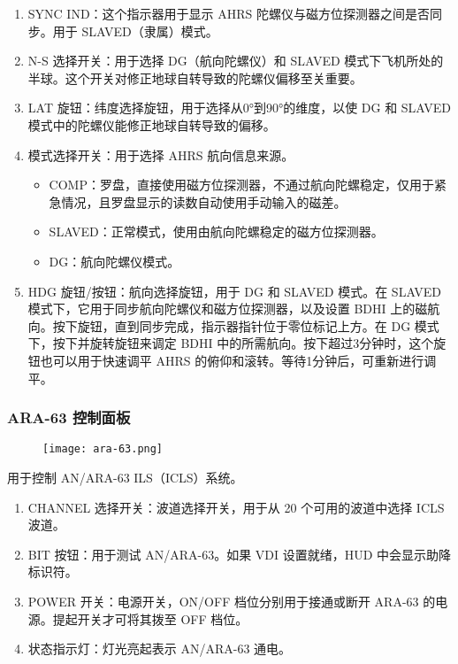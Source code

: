 \begin{enumerate}
	\item SYNC IND：这个指示器用于显示 AHRS 陀螺仪与磁方位探测器之间是否同步。用于 SLAVED（隶属）模式。
	\item N-S 选择开关：用于选择 DG（航向陀螺仪）和 SLAVED 模式下飞机所处的半球。这个开关对修正地球自转导致的陀螺仪偏移至关重要。
	\item LAT 旋钮：纬度选择旋钮，用于选择从0°到90°的维度，以使 DG 和 SLAVED 模式中的陀螺仪能修正地球自转导致的偏移。
	\item 模式选择开关：用于选择 AHRS 航向信息来源。
	      \begin{itemize}
		      \item COMP：罗盘，直接使用磁方位探测器，不通过航向陀螺稳定，仅用于紧急情况，且罗盘显示的读数自动使用手动输入的磁差。
		      \item SLAVED：正常模式，使用由航向陀螺稳定的磁方位探测器。
		      \item DG：航向陀螺仪模式。
	      \end{itemize}
	\item HDG 旋钮/按钮：航向选择旋钮，用于 DG 和 SLAVED 模式。在 SLAVED 模式下，它用于同步航向陀螺仪和磁方位探测器，以及设置 BDHI 上的磁航向。按下旋钮，直到同步完成，指示器指针位于零位标记上方。在 DG 模式下，按下并旋转旋钮来调定 BDHI 中的所需航向。按下超过3分钟时，这个旋钮也可以用于快速调平 AHRS 的俯仰和滚转。等待1分钟后，可重新进行调平。
\end{enumerate}

\subsubsection{ARA-63 控制面板}

\begin{figure}[htb]
	\centering
	\texttt{[image: ara-63.png]}
\end{figure}
用于控制 AN/ARA-63 ILS（ICLS）系统。

\begin{enumerate}
	\item CHANNEL 选择开关：波道选择开关，用于从 20 个可用的波道中选择 ICLS 波道。
	\item BIT 按钮：用于测试 AN/ARA-63。如果 VDI 设置就绪，HUD 中会显示助降标识符。
	\item POWER 开关：电源开关，ON/OFF 档位分别用于接通或断开 ARA-63 的电源。提起开关才可将其拨至 OFF 档位。
	\item 状态指示灯：灯光亮起表示 AN/ARA-63 通电。
\end{enumerate}

